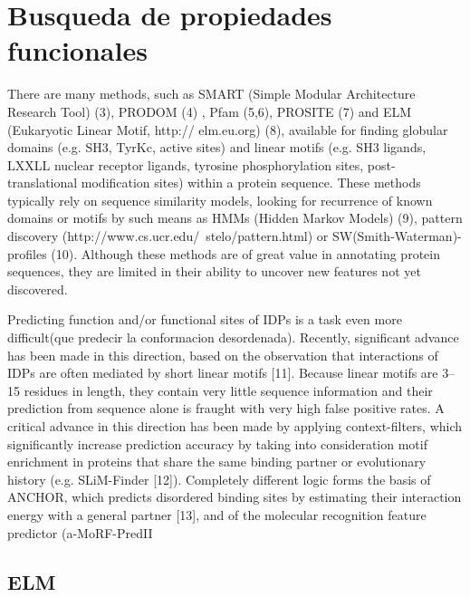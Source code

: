 \section{Busqueda de propiedades funcionales}


There are many methods, such as SMART (Simple Modular
Architecture Research Tool) (3), PRODOM (4) , Pfam (5,6),
PROSITE (7) and ELM (Eukaryotic Linear Motif, http://
elm.eu.org) (8), available for finding globular domains (e.g.
SH3, TyrKc, active sites) and linear motifs (e.g. SH3 ligands,
LXXLL nuclear receptor ligands, tyrosine phosphorylation
sites, post-translational modification sites) within a protein
sequence. These methods typically rely on sequence similarity
models, looking for recurrence of known domains or motifs by
such means as HMMs (Hidden Markov Models) (9), pattern
discovery
(http://www.cs.ucr.edu/~stelo/pattern.html)
or
SW(Smith-Waterman)-profiles (10). Although these methods
are of great value in annotating protein sequences, they are
limited in their ability to uncover new features not yet
discovered.




Predicting function and/or functional sites of IDPs is a task even more difficult(que predecir la conformacion desordenada). 
Recently, significant advance has been made in this direction, based on the observation that interactions of IDPs are often mediated by short linear motifs [11]. 
Because linear motifs are 3–15 residues in length, they contain very little sequence information and their prediction from sequence alone is fraught with very
high false positive rates. A critical advance in this direction has been made by applying context-filters, which significantly increase prediction accuracy by taking into
consideration motif enrichment in proteins that share the same binding partner or evolutionary history (e.g. SLiM-Finder [12]). 
Completely different logic forms the basis of ANCHOR, which predicts disordered binding sites by estimating their interaction energy with a general partner [13], and of the molecular recognition feature predictor
(a-MoRF-PredII  
 
\subsection{ELM}

